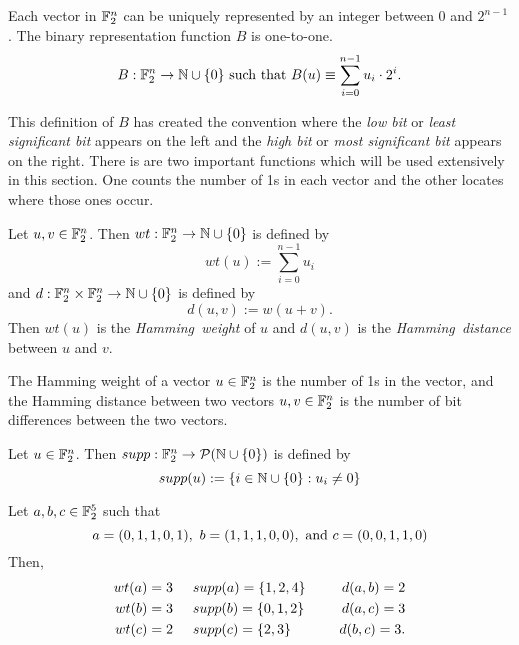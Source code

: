 \par Each vector in $\mathbb{F}_2^n$ can be uniquely represented by an integer between
$0$ and $2^{n-1}$. The binary representation function $B$ is one-to-one.
\begin{equation}
	B:\gftwo^n\rightarrow\nnn\cup\{0\}\ {\rm such\ that }\ B(u)\equiv \sum_{i=0}^{n-1}u_i\cdot2^i.
\end{equation}

\par This definition of $B$ has created the convention where the {\em low bit} or
{\em least significant bit} appears on the left and the {\em high bit} or {\em most significant bit}
appears on the right. There is are two important functions which will be used extensively in this
section. One counts the number of 1s in each vector and the other locates where those ones occur.

\begin{definition}
\label{def:Hamming}
	Let $u,v\in\mathbb{F}_2^n$. Then $wt:\mathbb{F}_2^n\rightarrow\mathbb{N}\cup\{0\}$ is defined by
	\[
	  wt(u):=\sum_{i=0}^{n-1}u_i
	\]
	and $d:\mathbb{F}_2^n\times\mathbb{F}_2^n\rightarrow\mathbb{N}\cup\{0\}$ is defined by
	\[
	  d(u,v):=w(u+v).
	\]
	Then $wt(u)$ is the {\em Hamming\ weight} of $u$ and $d(u,v)$ is the
	{\em Hamming\ distance} between $u$ and $v$.
\end{definition}

\begin{remark}
	The Hamming weight of a vector $u\in\mathbb{F}_2^n$ is the number of 1s in the vector, and the
	Hamming distance between two vectors $u,v\in\mathbb{F}_2^n$ is the number of bit differences
	between the two vectors.
\end{remark}

\begin{definition}
\label{def:support}
	Let $u\in\mathbb{F}_2^n$. Then $supp:\mathbb{F}_2^n\rightarrow\mathcal{P}(\mathbb{N}\cup\{0\})$ is defined by
	\[
		supp(u):=\{i\in\mathbb{N}\cup\{0\}:u_i\not=0\}
	\]
\end{definition}

\begin{example}
	Let $a,b,c\in\mathbb{F}_2^5$ such that
	\[
	a=(0,1,1,0,1),\ b=(1,1,1,0,0),\ {\rm and}\ c=(0,0,1,1,0)
	\]
	Then,
	\begin{align*}
		wt(a)=3 &\hspace{5mm} supp(a)=\{1,2,4\} &\hspace{5mm} d(a,b)=2\\
		wt(b)=3 &\hspace{5mm} supp(b)=\{0,1,2\} &\hspace{5mm} d(a,c)=3\\
		wt(c)=2 &\hspace{5mm} supp(c)=\{2,3\}   &\hspace{5mm} d(b,c)=3.\\
	\end{align*}
\end{example}

